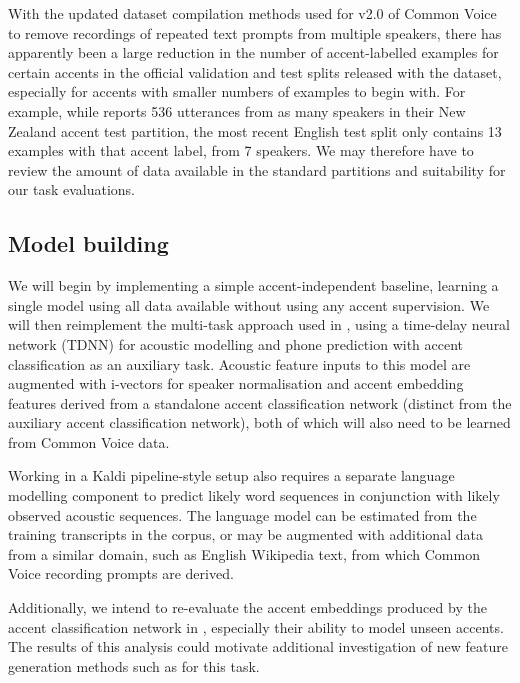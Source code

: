 \documentclass[a4paper]{article}
\begin{document}
With the updated dataset compilation methods used for v2.0 of Common Voice to remove recordings of repeated text prompts from multiple speakers, there has apparently been a large reduction in the number of accent-labelled examples for certain accents in the official validation and test splits released with the dataset, especially for accents with smaller numbers of examples to begin with.
For example, while \cite{jain2018ImprovedAccentedSpeech} reports 536 utterances from as many speakers in their New Zealand accent test partition, the most recent English test split only contains 13 examples with that accent label, from 7 speakers.
We may therefore have to review the amount of data available in the standard partitions and suitability for our task evaluations.

\subsection{Model building}

We will begin by implementing a simple accent-independent baseline, learning a single model using all data available without using any accent supervision.
We will then reimplement the multi-task approach used in \cite{jain2018ImprovedAccentedSpeech}, using a time-delay neural network (TDNN) \cite{peddinti2015TimeDelayNeural} for acoustic modelling and phone prediction with accent classification as an auxiliary task.
Acoustic feature inputs to this model are augmented with i-vectors for speaker normalisation \cite{dehak2011FrontEndFactorAnalysis} and accent embedding features derived from a standalone accent classification network (distinct from the auxiliary accent classification network), both of which will also need to be learned from Common Voice data.

Working in a Kaldi pipeline-style setup also requires a separate language modelling component to predict likely word sequences in conjunction with likely observed acoustic sequences.
The language model can be estimated from the training transcripts in the corpus, or may be augmented with additional data from a similar domain, such as English Wikipedia text, from which Common Voice recording prompts are derived.

Additionally, we intend to re-evaluate the accent embeddings produced by the accent classification network in \cite{jain2018ImprovedAccentedSpeech}, especially their ability to model unseen accents.
The results of this analysis could motivate additional investigation of new feature generation methods such as \cite{chen2019AIPNetGenerativeAdversarial} for this task.
\end{document}
